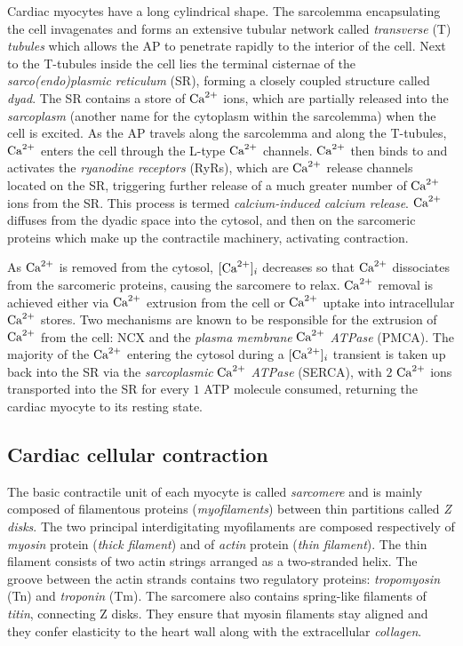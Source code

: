 \vspace{0.2cm}
Cardiac myocytes have a long cylindrical shape. The sarcolemma encapsulating the cell invagenates and forms an extensive tubular network called \textit{transverse} (\acs{T}) \textit{tubules} which allows the AP to penetrate rapidly to the interior of the cell. Next to the T-tubules inside the cell lies the terminal cisternae of the \textit{sarco(endo)plasmic reticulum} (\acs{SR}), forming a closely coupled structure called \textit{dyad}. The SR contains a store of $\textrm{Ca}^{2+}$ ions, which are partially released into the \textit{sarcoplasm} (another name for the cytoplasm within the sarcolemma) when the cell is excited. As the AP travels along the sarcolemma and along the T-tubules, $\textrm{Ca}^{2+}$ enters the cell through the L-type $\textrm{Ca}^{2+}$ channels. $\textrm{Ca}^{2+}$ then binds to and activates the \textit{ryanodine receptors} (\acs{RyR}s), which are $\textrm{Ca}^{2+}$ release channels located on the SR, triggering further release of a much greater number of $\textrm{Ca}^{2+}$ ions from the SR. This process is termed \textit{calcium-induced calcium release}. $\textrm{Ca}^{2+}$ diffuses from the dyadic space into the cytosol, and then on the sarcomeric proteins which make up the contractile machinery, activating contraction.

\vspace{0.2cm}
As $\textrm{Ca}^{2+}$ is removed from the cytosol, $[\textrm{Ca}^{2+}]_{i}$ decreases so that $\textrm{Ca}^{2+}$ dissociates from the sarcomeric proteins, causing the sarcomere to relax. $\textrm{Ca}^{2+}$ removal is achieved either via $\textrm{Ca}^{2+}$ extrusion from the cell or $\textrm{Ca}^{2+}$ uptake into intracellular $\textrm{Ca}^{2+}$ stores. Two mechanisms are known to be responsible for the extrusion of $\textrm{Ca}^{2+}$ from the cell: NCX and the \textit{plasma membrane} $\textrm{Ca}^{2+}$ \textit{ATPase} (\acs{PMCA}). The majority of the $\textrm{Ca}^{2+}$ entering the cytosol during a $[\textrm{Ca}^{2+}]_{i}$ transient is taken up back into the SR via the \textit{sarcoplasmic} $\textrm{Ca}^{2+}$ \textit{ATPase} (\acs{SERCA}), with $2$ $\textrm{Ca}^{2+}$ ions transported into the SR for every $1$ ATP molecule consumed, returning the cardiac myocyte to its resting state.


%
%
%
\subsection{Cardiac cellular contraction}\label{sec:ch1cardiac_cellular_contraction}
The basic contractile unit of each myocyte is called \textit{sarcomere} and is mainly composed of filamentous proteins (\textit{myofilaments}) between thin partitions called \textit{Z disks}. The two principal interdigitating myofilaments are composed respectively of \textit{myosin} protein (\textit{thick filament}) and of \textit{actin} protein (\textit{thin filament}). The thin filament consists of two actin strings arranged as a two-stranded helix. The groove between the actin strands contains two regulatory proteins: \textit{tropomyosin} (\acs{Tn}) and \textit{troponin} (\acs{Tm}). The sarcomere also contains spring-like filaments of \textit{titin}, connecting Z disks. They ensure that myosin filaments stay aligned and they confer elasticity to the heart wall along with the extracellular \textit{collagen}.

